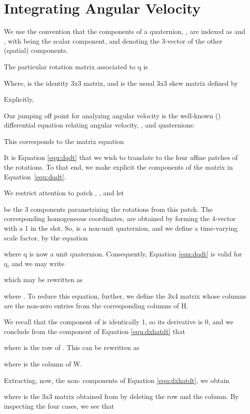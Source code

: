 \documentclass{gen-j-l}
\theoremstyle{definition}
\theoremstyle{remark}
\numberwithin{equation}{section}
\begin{document}
\section{Integrating Angular Velocity}

We use the convention that the components of a quaternion, , are
indexed as  and , with  being the scalar
component, and  denoting the 3-vector of the other (spatial) components.  

The particular rotation matrix associated to q is


Where,  is the identity 3x3 matrix, and  
 is the usual 3x3 skew matrix defined by 

Explicitly,


Our jumping off point for analyzing angular velocity is the well-known
(\cite{schultz06}\cite{rogers03})
differential equation relating angular velocity, , and quaternions:


This corresponds to the matrix equation

 
It is Equation \ref{equ:dqdt} that we wish to translate to the four affine 
patches of the rotations.  To that end, we make explicit the components 
of the matrix in Equation~\ref{equ:dqdt}.


We restrict attention to patch , , and let

be the 3 components parametrizing the rotations from this patch.  The corresponding
homogeneous coordinates,  are obtained by forming the 4-vector with a 1
in the  slot.  So,  is a non-unit quaternion, and we define a time-varying
scale factor,  by the equation

where q is now a unit quaternion.  Consequently, Equation \ref{equ:dqdt} 
is valid for q, and we may write


which may be rewritten as

where .  To reduce this equation, further,
we define the 3x4 matrix whose columns are the non-zero entries from the
corresponding columns of H.


We recall that the  component of  is identically 1, so its derivative is 0,
and we conclude from the  component of Equation \ref{equ:dxhatdt} that 

where  is the  row of .  This can be rewritten as

where  is the  column of W.

Extracting, now, the non- components of Equation \ref{equ:dxhatdt}, we obtain

where  is the 3x3 matrix obtained from  by deleting the  row
and the  column.  By inspecting the four cases, we see that
\end{document}
